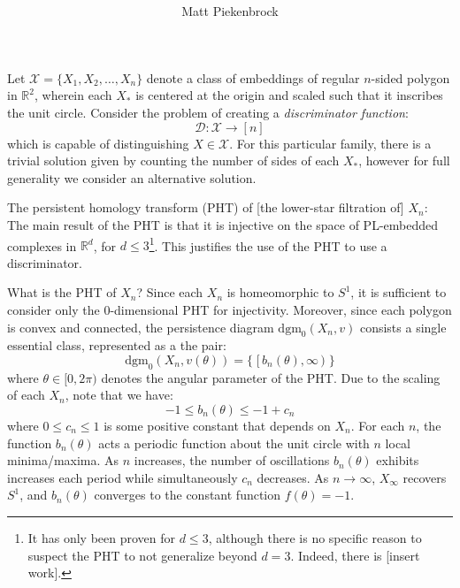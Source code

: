 \documentclass[10pt]{article}
\title{\vspace{-2.0em} \vspace{-0.5em}}
\author{Matt Piekenbrock}
\date{}
\begin{document}
 \vspace{-2em} \maketitle \vspace{-1em}
\noindent
Let $\mathcal{X} = \{ X_1, X_2, \dots, X_n \}$ denote a class of embeddings of regular $n$-sided polygon in $\mathbb{R}^2$, wherein each $X_\ast$ is centered at the origin and scaled such that it inscribes the unit circle. Consider the problem of creating a \emph{discriminator function}:
$$ \mathcal{D}: \mathcal{X} \to [n] $$
which is capable of distinguishing $X \in \mathcal{X}$. For this particular family, there is a trivial solution given by counting the number of sides of each $X_\ast$, however for full generality we consider an alternative solution. 

The persistent homology transform (PHT) of [the lower-star filtration of] $X_n$: 
$$ $$
The main result of the PHT is that it is injective on the space of PL-embedded complexes in $\mathbb{R}^d$, for $d \leq 3$\footnote{It has only been proven for $d \leq 3$, although there is no specific reason to suspect the PHT to not generalize beyond $d = 3$. Indeed, there is [insert work].}. 
This justifies the use of the PHT to use a discriminator. 

What is the PHT of $X_n$? Since each $X_n$ is homeomorphic to $S^1$, it is sufficient to consider only the $0$-dimensional PHT for injectivity. Moreover, since each polygon is convex and connected, the persistence diagram $\mathrm{dgm}_0(X_n, v)$ consists a single essential class, represented as a the pair: 
$$ \mathrm{dgm}_0(X_n, v(\theta)) = \{ \; [\,b_n(\theta), \infty \,) \; \}$$
where $\theta \in [0, 2 \pi )$ denotes the angular parameter of the PHT. Due to the scaling of each $X_n$, note that we have:
$$
-1 \leq b_n(\theta) \leq -1 + c_n
$$
where $0 \leq c_n \leq 1$ is some positive constant that depends on $X_n$. For each $n$, the function $b_n(\theta)$ acts a periodic function about the unit circle with $n$ local minima/maxima. As $n$ increases, the number of oscillations $b_n(\theta)$ exhibits increases each period while simultaneously $c_n$ decreases. As $n \to \infty$, $X_\infty$ recovers $S^1$, and $b_n(\theta)$ converges to the constant function $f(\theta) = -1$.   
\end{document}
